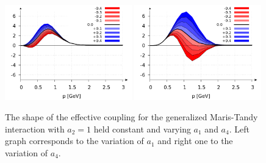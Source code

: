 \begin{figure}[!t]
  \begin{center}
    \includegraphics[width=0.49\textwidth]{figures/maris_a1}
    \includegraphics[width=0.49\textwidth]{figures/maris_a4}
    \caption{The shape of the effective coupling for the generalized Maris-Tandy interaction with $a_2=1$ held constant
             and varying $a_1$ and $a_4$. Left graph corresponds to the variation of $a_1$ and right one to the variation of $a_4$. }
    \label{fig:slope_a1}
  \end{center}
 \end{figure} \\
 
